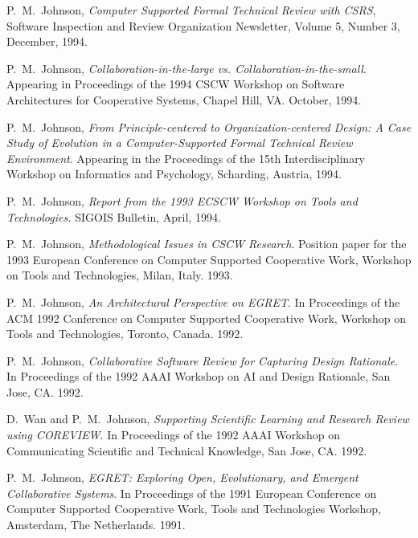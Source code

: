 \begin{Workshop Publications}
  
\item P.~M.~Johnson, {\em Computer Supported Formal Technical Review with
    CSRS}, Software Inspection and Review Organization Newsletter, Volume
  5, Number 3, December, 1994.

\item P.~M.~Johnson, 
  {\em Collaboration-in-the-large vs. Collaboration-in-the-small}.  
  Appearing in Proceedings of the 1994 CSCW Workshop on Software Architectures for
  Cooperative Systems, Chapel Hill, VA. October, 1994.

\item P.~M.~Johnson, {\em From Principle-centered to
  Organization-centered Design: A Case Study of Evolution in a  Computer-Supported Formal Technical Review Environment}. 
  Appearing in the Proceedings of the 15th Interdisciplinary Workshop
  on Informatics and Psychology, Scharding, Austria, 1994.
  
\item P.~M.~Johnson, 
      {\em Report from the 1993 ECSCW Workshop on
           Tools and Technologies.} SIGOIS Bulletin, April, 1994.

\item P.~M.~Johnson,
      {\em Methodological Issues in CSCW Research}.  Position paper for 
      the 1993 European Conference on Computer Supported Cooperative Work,
      Workshop on Tools and Technologies, Milan, Italy.  1993.

\item P.~M.~Johnson, 
     {\em An Architectural Perspective on EGRET}.
     In Proceedings of the ACM 1992 Conference on Computer Supported
     Cooperative Work, Workshop on Tools and Technologies,  Toronto, Canada. 
     1992.

\item P.~M.~Johnson, 
     {\em Collaborative Software Review for Capturing Design Rationale}.
     In Proceedings of the 1992 AAAI Workshop on AI and Design Rationale,
     San Jose, CA.
     1992.

\item D.~Wan and P.~M.~Johnson, 
     {\em Supporting Scientific Learning and Research Review using COREVIEW}.
     In Proceedings of the 1992 AAAI Workshop on Communicating Scientific
     and Technical Knowledge, San Jose, CA.
     1992.
     
\item P.~M.~Johnson, {\em EGRET: Exploring Open, Evolutionary, and
     Emergent Collaborative Systems}. In Proceedings of the 1991 European
     Conference on Computer Supported Cooperative Work, Tools and
     Technologies Workshop, Amsterdam, The Netherlands. 1991.


\end{Workshop Publications}

